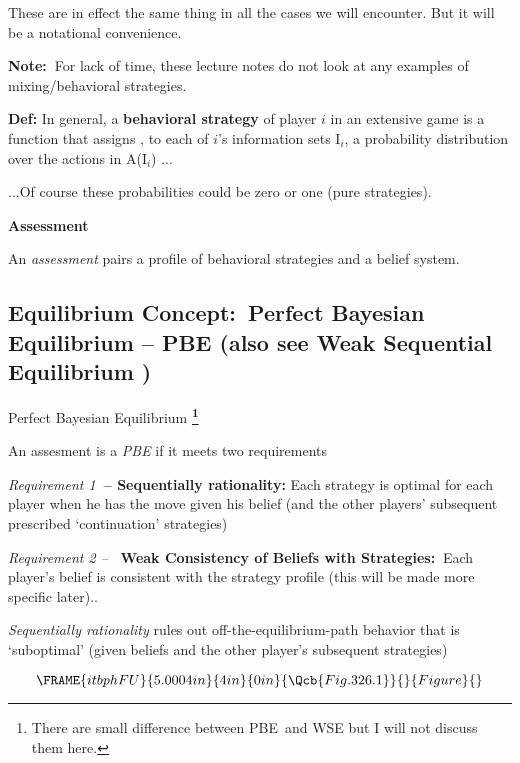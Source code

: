 \documentclass{article}
\begin{document}
These are in effect the same thing in all the cases we will encounter. But
it will be a notational convenience.

\textbf{Note:\ }For lack of time, these lecture notes do not look at any
examples of mixing/behavioral strategies.

\bigskip

\textbf{Def: }In general, a \textbf{behavioral strategy} of player $i$ in an
extensive game is a function that assigns , to each of $i$'s information
sets I$_{i}$, a probability distribution over the actions in A(I$_{i}$) ...
\ 

...Of course these probabilities could be zero or one (pure strategies).

\bigskip

\textbf{Assessment}

An \textit{assessment} pairs a profile of behavioral strategies and a belief
system.

\bigskip

\subsection{Equilibrium Concept:\ Perfect Bayesian Equilibrium -- PBE  (also
see Weak Sequential Equilibrium )}

Perfect Bayesian Equilibrium  \textbf{\footnote{%
There are small difference between PBE\ and WSE but I will not discuss them
here.}}

An assesment is a \textit{PBE }if it meets two requirements

\bigskip

\textit{Requirement 1}\textbf{\ -- Sequentially rationality:} Each strategy
is optimal for each player when he has the move given his belief (and the
other players' subsequent prescribed `continuation' strategies)

\bigskip

\textit{Requirement 2 -- }\textbf{\ Weak Consistency of Beliefs with
Strategies: }$\ $Each player's belief is consistent with the strategy
profile (this will be made more specific later)..

\bigskip

\textit{Sequentially rationality} rules out off-the-equilibrium-path
behavior that is `suboptimal' (given beliefs and the other player's
subsequent strategies)

\pagebreak

\begin{equation}
\FRAME{itbphFU}{5.0004in}{4in}{0in}{\Qcb{Fig. 326.1}}{}{Figure}{\special%
{language "Scientific Word";type "GRAPHIC";maintain-aspect-ratio
TRUE;display "USEDEF";valid_file "T";width 5.0004in;height 4in;depth
0in;original-width 5.3599in;original-height 4.4317in;cropleft "0";croptop
"1";cropright "1";cropbottom "0";tempfilename
'JSH1WT09.wmf';tempfile-properties "XPR";}}
\end{equation}
\end{document}
